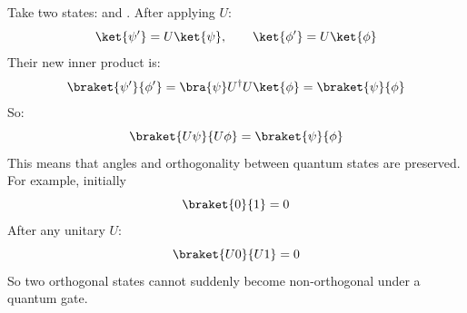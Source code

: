 \begin{remarkbox}
    \highspace
     Take two states: \ket{\psi} and \ket{\phi}. After applying $U$:
    \begin{equation*}
        \ket{\psi'}=U\ket{\psi},
        \qquad
        \ket{\phi'}=U\ket{\phi}
    \end{equation*}
    Their new inner product is:
    \begin{equation*}
        \begin{aligned}
            \braket{\psi'}{\phi'} = \bra{\psi} U^\dagger U \ket{\phi} = \braket{\psi}{\phi}
        \end{aligned}
    \end{equation*}
    So:
    \begin{equation*}
        \braket{U\psi}{U\phi}
        =
        \braket{\psi}{\phi}
    \end{equation*}
    This means that angles and orthogonality between quantum states are preserved. For example, initially
    \begin{equation*}
        \braket{0}{1}=0
    \end{equation*}
    After any unitary $U$:
    \begin{equation*}
        \braket{U0}{U1}=0
    \end{equation*}
    So two orthogonal states cannot suddenly become non-orthogonal under a quantum gate.


\end{remarkbox}
